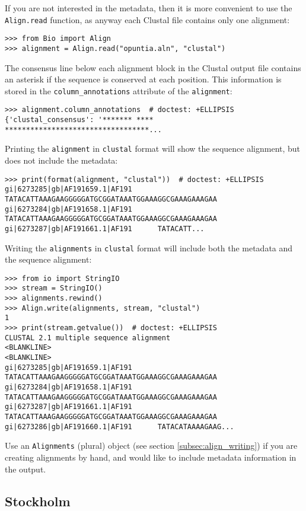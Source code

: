 If you are not interested in the metadata, then it is more convenient to use the \verb|Align.read| function, as anyway each Clustal file contains only one alignment:
\begin{verbatim}
>>> from Bio import Align
>>> alignment = Align.read("opuntia.aln", "clustal")
\end{verbatim}
The consensus line below each alignment block in the Clustal output file contains an asterisk if the sequence is conserved at each position. This information is stored in the \verb|column_annotations| attribute of the \verb|alignment|:
\begin{verbatim}
>>> alignment.column_annotations  # doctest: +ELLIPSIS
{'clustal_consensus': '******* **** **********************************...
\end{verbatim}
Printing the \verb|alignment| in \verb|clustal| format will show the sequence alignment, but does not include the metadata:
\begin{verbatim}
>>> print(format(alignment, "clustal"))  # doctest: +ELLIPSIS
gi|6273285|gb|AF191659.1|AF191      TATACATTAAAGAAGGGGGATGCGGATAAATGGAAAGGCGAAAGAAAGAA
gi|6273284|gb|AF191658.1|AF191      TATACATTAAAGAAGGGGGATGCGGATAAATGGAAAGGCGAAAGAAAGAA
gi|6273287|gb|AF191661.1|AF191      TATACATT...
\end{verbatim}
Writing the \verb|alignments| in \verb|clustal| format will include both the metadata and the sequence alignment:
\begin{verbatim}
>>> from io import StringIO
>>> stream = StringIO()
>>> alignments.rewind()
>>> Align.write(alignments, stream, "clustal")
1
>>> print(stream.getvalue())  # doctest: +ELLIPSIS
CLUSTAL 2.1 multiple sequence alignment
<BLANKLINE>
<BLANKLINE>
gi|6273285|gb|AF191659.1|AF191      TATACATTAAAGAAGGGGGATGCGGATAAATGGAAAGGCGAAAGAAAGAA
gi|6273284|gb|AF191658.1|AF191      TATACATTAAAGAAGGGGGATGCGGATAAATGGAAAGGCGAAAGAAAGAA
gi|6273287|gb|AF191661.1|AF191      TATACATTAAAGAAGGGGGATGCGGATAAATGGAAAGGCGAAAGAAAGAA
gi|6273286|gb|AF191660.1|AF191      TATACATAAAAGAAG...
\end{verbatim}
Use an \verb|Alignments| (plural) object (see section \ref{subsec:align_writing}) if you are creating alignments by hand, and would like to include metadata information in the output.

\subsection{Stockholm}
\label{subsec:align_stockholm}

